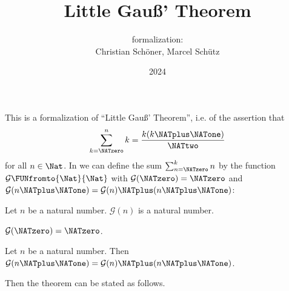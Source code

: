 \documentclass{article}
\title{Little Gauß' Theorem}
\author{\Naproche formalization:\\[0.5em]Christian Schöner, Marcel Schütz}
\date{2024}
\newcommand{\gauss}{\mathcal{G}}
\begin{document}
  \maketitle


  \noindent This is a formalization of ``Little Gauß' Theorem'', i.e. of
  the assertion that
  \[\sum_{k=\NATzero}^n k = \frac{k(k \NATplus \NATone)}\NATtwo\]
  for all $n \in \Nat$.
  In \Naproche we can define the sum $\sum_{n=\NATzero}^k n$ by the function
  $\gauss \FUNfromto{\Nat}{\Nat}$ with $\gauss(\NATzero) = \NATzero$ and
  $\gauss(n \NATplus \NATone) = \gauss(n) \NATplus (n \NATplus \NATone)$:

  \begin{forthel}
    \begin{signature*}
      Let $n$ be a natural number.
      $\gauss(n)$ is a natural number.
    \end{signature*}

    \begin{axiom*}
      $\gauss(\NATzero) = \NATzero$.
    \end{axiom*}

    \begin{axiom*}
      Let $n$ be a natural number.
      Then $\gauss(n \NATplus \NATone) = \gauss(n) \NATplus (n \NATplus \NATone)$.
    \end{axiom*}
  \end{forthel}

  \noindent Then the theorem can be stated as follows.
\end{document}
